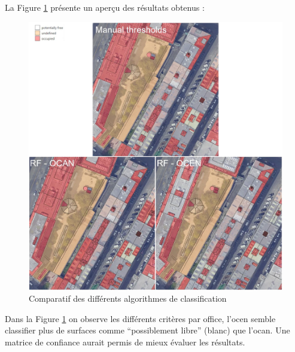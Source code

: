 {{\par{La Figure \ref{fig:stdl_04_rf_resultats} présente un aperçu des résultats obtenus :}
\begin{figure}[H]
    \centering
    \includegraphics[width=1\linewidth]{02-main//figures/stdl_04_rf_resultats.png}
    \caption{Comparatif des différents algorithmes de classification \cite{herny_detection_2024}}
    \label{fig:stdl_04_rf_resultats}
\end{figure}
\par{Dans la Figure \ref{fig:stdl_04_rf_resultats} on observe les différents critères par office, l'\acrshort{ocen} semble classifier plus de surfaces comme ``possiblement libre'' (blanc) que l'\acrshort{ocan}. Une matrice de confiance aurait permis de mieux évaluer les résultats.}

}}
